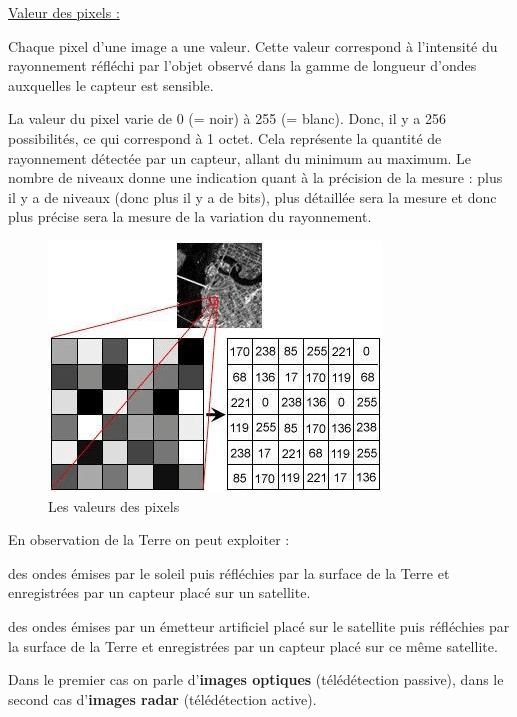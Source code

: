 \documentclass[12pt, openany]{report}
\begin{document}
\par
\underline{Valeur des pixels :}
\par 

Chaque pixel d’une image a une valeur. Cette valeur correspond à l’intensité du rayonnement réfléchi par l’objet observé dans la gamme de longueur d’ondes auxquelles le capteur est sensible. \cite{ref3}

La valeur du pixel varie de 0 (= noir) à 255 (= blanc). Donc, il y a 256 possibilités, ce qui correspond à 1 octet. Cela représente la quantité de rayonnement détectée par un capteur, allant du minimum au maximum. Le nombre de niveaux donne une indication quant à la précision de la mesure : plus il y a de niveaux (donc plus il y a de bits), plus détaillée sera la mesure et donc plus précise sera la mesure de la variation du rayonnement.

\begin{figure}[h]
\centering
\includegraphics[scale=1.2]{pixel_values.png}
\caption{Les valeurs des pixels}
\end{figure}

\par
En observation de la Terre on peut exploiter :
\begin{mylist}
\item
des ondes émises par le soleil puis réfléchies par la surface de la Terre et enregistrées par un capteur placé sur un satellite.
\item
des ondes émises par un émetteur artificiel placé sur le satellite puis réfléchies par la surface de la Terre et enregistrées par un capteur placé sur ce même satellite.
\end{mylist}

Dans le premier cas on parle d'\textbf{images optiques} (télédétection passive), dans le second cas d'\textbf{images radar} (télédétection active).
\end{document}
